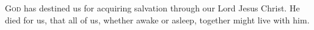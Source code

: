\lettrine[loversize=0.15,lines=2]{G}{od} has destined us for acquiring salvation through our Lord Jesus \linebreak Christ. He died for us, that all of us, whether awake or asleep, together might live with him.
